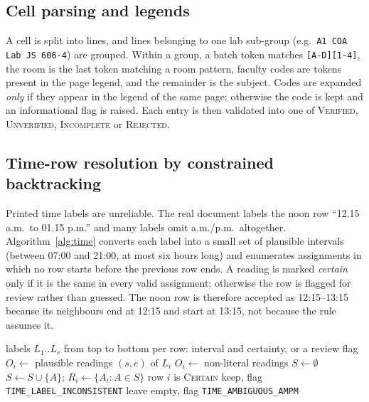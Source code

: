 \documentclass[conference]{IEEEtran}
\begin{document}
\subsection{Cell parsing and legends}
A cell is split into lines, and lines belonging to one lab sub-group (e.g.\ \texttt{A1 COA Lab JS 606-4})
are grouped. Within a group, a batch token matches \texttt{[A-D][1-4]}, the room is the last token
matching a room pattern, faculty codes are tokens present in the page legend, and the remainder is the
subject. Codes are expanded \emph{only} if they appear in the legend of the same page; otherwise the code
is kept and an informational flag is raised. Each entry is then validated into one of
\textsc{Verified}, \textsc{Unverified}, \textsc{Incomplete} or \textsc{Rejected}.

\subsection{Time-row resolution by constrained backtracking}
Printed time labels are unreliable. The real document labels the noon row ``12.15 a.m.\ to 01.15 p.m.''
and many labels omit a.m./p.m.\ altogether. Algorithm~\ref{alg:time} converts each label into a small set
of plausible intervals (between 07:00 and 21:00, at most six hours long) and enumerates assignments in
which no row starts before the previous row ends. A reading is marked \emph{certain} only if it is the
same in every valid assignment; otherwise the row is flagged for review rather than guessed. The noon row
is therefore accepted as 12:15--13:15 because its neighbours end at 12:15 and start at 13:15, not because
the rule assumes it.

\begin{algorithm}[t]
\caption{Resolve a column of time labels}\label{alg:time}
\begin{algorithmic}[1]
\Require labels $L_1..L_r$ from top to bottom
\Ensure per row: interval and certainty, or a review flag
  \State $O_i \gets$ plausible readings $(s,e)$ of $L_i$
   $O_i \gets$ non-literal readings \EndIf
\EndFor
\State $S \gets \emptyset$
   \Return \EndIf
   $S \gets S \cup \{A\}$; \Return \EndIf
     \State {}
  \EndFor
\EndProcedure
\State {}
  \State $R_i \gets \{A_i : A \in S\}$
   row $i$ is \textsc{Certain}
   keep, flag \texttt{TIME\_LABEL\_INCONSISTENT}
  \Else{} leave empty, flag \texttt{TIME\_AMBIGUOUS\_AMPM}
  \EndIf
\EndFor
\end{algorithmic}
\end{algorithm}
\end{document}

